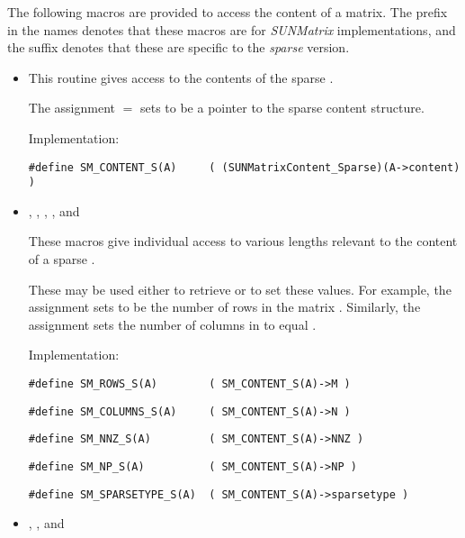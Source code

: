\noindent The following macros are provided to access the
content of a {\sunmatsparse} matrix. The prefix  in the names
denotes that these macros are for \emph{SUNMatrix} implementations,
and the suffix  denotes that these are specific to
the \emph{sparse} version.
\begin{itemize}

\item {}
    
  This routine gives access to the contents of the
  sparse .
  
  The assignment  $=$  sets           
   to be a pointer to the sparse  content  
  structure.                                             
                                                            
  Implementation: 
  
  \verb|#define SM_CONTENT_S(A)     ( (SUNMatrixContent_Sparse)(A->content) )|
  
\item {}, , , , and 

  These macros give individual access to various lengths relevant to the
  content of a sparse .
                                                               
  These may be used either to retrieve or to set these values.  For
  example, the assignment  sets  to be
  the number of rows in the matrix .  Similarly, the
  assignment  sets the number of
  columns in  to equal .
  
  Implementation: 
  
  \verb|#define SM_ROWS_S(A)        ( SM_CONTENT_S(A)->M )|

  \verb|#define SM_COLUMNS_S(A)     ( SM_CONTENT_S(A)->N )|

  \verb|#define SM_NNZ_S(A)         ( SM_CONTENT_S(A)->NNZ )|

  \verb|#define SM_NP_S(A)          ( SM_CONTENT_S(A)->NP )|

  \verb|#define SM_SPARSETYPE_S(A)  ( SM_CONTENT_S(A)->sparsetype )|


\item {}, , and 
                                                            

\end{itemize}
